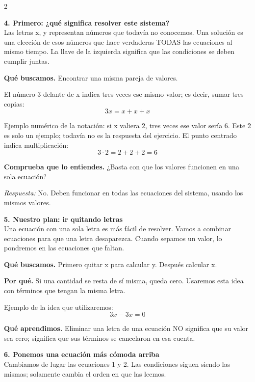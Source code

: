 \documentclass[11pt,a4paper,landscape]{article}
\begin{document}
\begin{multicols*}{2}
\noindent\begin{minipage}{\linewidth}\textbf{4. Primero: ¿qué significa resolver este sistema?}\\[2pt]Las letras x, y representan números que todavía no conocemos. Una solución es una elección de esos números que hace verdaderas TODAS las ecuaciones al mismo tiempo. La llave de la izquierda significa que las condiciones se deben cumplir juntas.
\par\smallskip\textbf{Qué buscamos.} Encontrar una misma pareja de valores.
\par\smallskip El número 3 delante de x indica tres veces ese mismo valor; es decir, sumar tres copias:
\[3x=x+x+x\]
\par\smallskip Ejemplo numérico de la notación: si x valiera 2, tres veces ese valor sería 6. Este 2 es solo un ejemplo; todavía no es la respuesta del ejercicio. El punto centrado indica multiplicación:
\[3\cdot 2=2+2+2=6\]
\par\smallskip\textbf{Comprueba que lo entiendes.} ¿Basta con que los valores funcionen en una sola ecuación?\par\textit{Respuesta:} No. Deben funcionar en todas las ecuaciones del sistema, usando los mismos valores.
\end{minipage}\par\medskip
\noindent\begin{minipage}{\linewidth}\textbf{5. Nuestro plan: ir quitando letras}\\[2pt]Una ecuación con una sola letra es más fácil de resolver. Vamos a combinar ecuaciones para que una letra desaparezca. Cuando sepamos un valor, lo pondremos en las ecuaciones que faltan.
\par\smallskip\textbf{Qué buscamos.} Primero quitar x para calcular y. Después calcular x.
\par\smallskip\textbf{Por qué.} Si una cantidad se resta de sí misma, queda cero. Usaremos esta idea con términos que tengan la misma letra.
\par\smallskip Ejemplo de la idea que utilizaremos:
\[3x-3x=0\]
\par\smallskip\textbf{Qué aprendimos.} Eliminar una letra de una ecuación NO significa que su valor sea cero; significa que sus términos se cancelaron en esa cuenta.
\end{minipage}\par\medskip
\noindent\begin{minipage}{\linewidth}\textbf{6. Ponemos una ecuación más cómoda arriba}\\[2pt]Cambiamos de lugar las ecuaciones 1 y 2. Las condiciones siguen siendo las mismas; solamente cambia el orden en que las leemos.

\end{minipage}
\end{multicols*}
\end{document}
